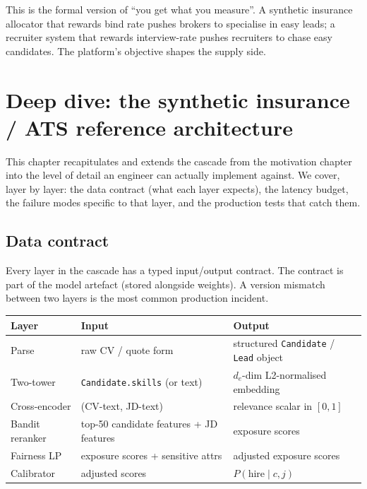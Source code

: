 \documentclass[11pt,oneside]{scrbook}
\begin{document}
This is the formal version of ``you get what you measure''. A synthetic insurance
allocator that rewards bind rate pushes brokers to specialise in easy
leads; a recruiter system that rewards interview-rate pushes recruiters
to chase easy candidates. The platform's objective shapes the supply side.

\chapter{Deep dive: the synthetic insurance / ATS reference architecture}

This chapter recapitulates and extends the cascade from the motivation
chapter into the level of detail an engineer can actually implement
against. We cover, layer by layer: the data contract (what each layer
expects), the latency budget, the failure modes specific to that layer,
and the production tests that catch them.

\section{Data contract}

Every layer in the cascade has a typed input/output contract. The contract
is part of the model artefact (stored alongside weights). A version
mismatch between two layers is the most common production incident.

\begin{center}
\begin{tabular}{@{}p{2.2cm}p{5.2cm}p{6.3cm}@{}}
\toprule
Layer & Input & Output \\
\midrule
Parse & raw CV / quote form & structured \texttt{Candidate} / \texttt{Lead} object \\
Two-tower & \texttt{Candidate.skills} (or text) & $d_e$-dim L2-normalised embedding \\
Cross-encoder & (CV-text, JD-text) & relevance scalar in $[0, 1]$ \\
Bandit reranker & top-50 candidate features + JD features & exposure scores \\
Fairness LP & exposure scores + sensitive attrs & adjusted exposure scores \\
Calibrator & adjusted scores & $P(\text{hire} \mid c, j)$ \\
\bottomrule
\end{tabular}
\end{center}
\end{document}
